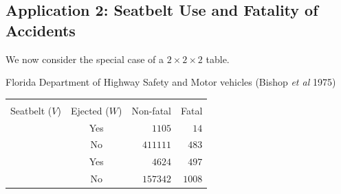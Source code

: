 \documentclass[oneside]{book}\usepackage[]{graphicx}\usepackage[svgnames]{xcolor}
\begin{document}
\subsection*{Application 2: Seatbelt Use and Fatality of Accidents}
We now consider the special case of a $ 2\times 2\times 2 $ table.
\begin{Example}{Florida Department of Highway Safety and Motor vehicles (Bishop \emph{et al} 1975)}
    \begin{center}
        \begin{NiceTabular}{ccrr}
            \toprule
            &                 &            \\
            Seatbelt ($ V $) & Ejected ($ W $) & Non-fatal & Fatal          \\
            \midrule
             & Yes & $ 1105 $ & $ 14 $\\
            & No & $ 411111 $ & $ 483 $\\
             & Yes & $ 4624 $ & $ 497 $\\
            & No & $ 157342 $ & $ 1008 $\\
            \bottomrule
        \end{NiceTabular}
    \end{center}
\end{Example}
\end{document}
